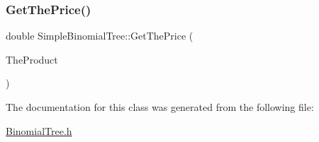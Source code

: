 \hypertarget{classSimpleBinomialTree_a8fbbcebf7f07fb4fd8b42ca00acd2805}{}\label{classSimpleBinomialTree_a8fbbcebf7f07fb4fd8b42ca00acd2805} 
\subsubsection{\texorpdfstring{Get\+The\+Price()}{GetThePrice()}}
{\footnotesize\ttfamily double Simple\+Binomial\+Tree\+::\+Get\+The\+Price (\begin{DoxyParamCaption}\item[{const \hyperlink{classTreeProduct}{Tree\+Product} \&}]{The\+Product }\end{DoxyParamCaption})}



The documentation for this class was generated from the following file\+:\begin{DoxyCompactItemize}
\item 
\hyperlink{BinomialTree_8h}{Binomial\+Tree.\+h}\end{DoxyCompactItemize}

